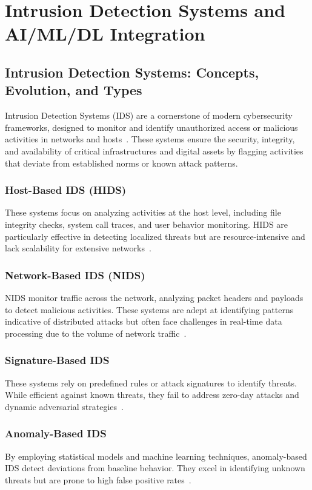 \section{Intrusion Detection Systems and AI/ML/DL Integration}
\label{FoundationalConcepts}

\subsection{Intrusion Detection Systems: Concepts, Evolution, and Types}
Intrusion Detection Systems (IDS) are a cornerstone of modern cybersecurity frameworks, designed to monitor and identify unauthorized access or malicious activities in networks and hosts~\cite{Mirlekar2022}. These systems ensure the security, integrity, and availability of critical infrastructures and digital assets by flagging activities that deviate from established norms or known attack patterns.

\subsubsection{Host-Based IDS (HIDS)} These systems focus on analyzing activities at the host level, including file integrity checks, system call traces, and user behavior monitoring. HIDS are particularly effective in detecting localized threats but are resource-intensive and lack scalability for extensive networks~\cite{vinayakumar2019deep}. 

\subsubsection{Network-Based IDS (NIDS)} NIDS monitor traffic across the network, analyzing packet headers and payloads to detect malicious activities. These systems are adept at identifying patterns indicative of distributed attacks but often face challenges in real-time data processing due to the volume of network traffic~\cite{Meena2021}.

\subsubsection{Signature-Based IDS} These systems rely on predefined rules or attack signatures to identify threats. While efficient against known threats, they fail to address zero-day attacks and dynamic adversarial strategies~\cite{Sadia2024}. 

\subsubsection{Anomaly-Based IDS} By employing statistical models and machine learning techniques, anomaly-based IDS detect deviations from baseline behavior. They excel in identifying unknown threats but are prone to high false positive rates~\cite{Jayalaxmi2022}. 

